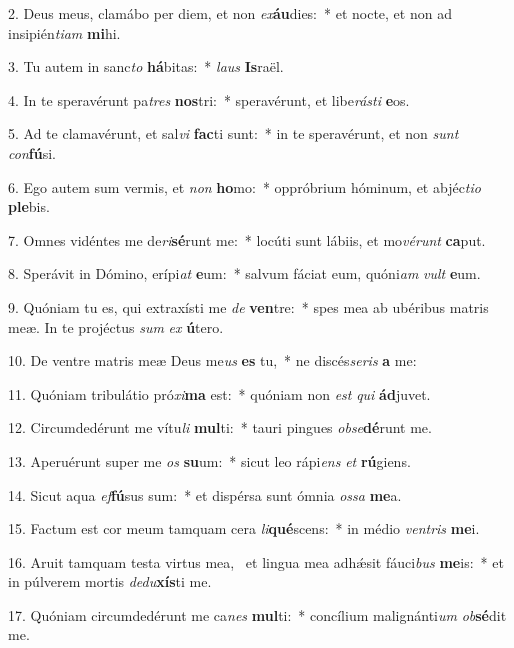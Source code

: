 2. Deus meus, clamábo per diem, et non \textit{ex}\textbf{áu}dies:~*  et nocte, et non ad insipién\textit{ti}\textit{am} \textbf{mi}hi.\

3. Tu autem in sanc\textit{to} \textbf{há}bitas:~*  \textit{laus} \textbf{Is}raël.\

4. In te speravérunt pa\textit{tres} \textbf{nos}tri:~*  speravérunt, et libe\textit{rás}\textit{ti} \textbf{e}os.\

5. Ad te clamavérunt, et sal\textit{vi} \textbf{fac}ti sunt:~*  in te speravérunt, et non \textit{sunt} \textit{con}\textbf{fú}si.\

6. Ego autem sum vermis, et \textit{non} \textbf{ho}mo:~*  oppróbrium hóminum, et abjéc\textit{ti}\textit{o} \textbf{ple}bis.\

7. Omnes vidéntes me de\textit{ri}\textbf{sé}runt me:~*  locúti sunt lábiis, et mo\textit{vé}\textit{runt} \textbf{ca}put.\

8. Sperávit in Dómino, erípi\textit{at} \textbf{e}um:~*  salvum fáciat eum, quóni\textit{am} \textit{vult} \textbf{e}um.\

9. Quóniam tu es, qui extraxísti me \textit{de} \textbf{ven}tre:~*  spes mea ab ubéribus matris meæ. In te projéctus \textit{sum} \textit{ex} \textbf{ú}tero.\

10. De ventre matris meæ Deus me\textit{us} \textbf{es} tu,~*  ne discés\textit{se}\textit{ris} \textbf{a} me:\

11. Quóniam tribulátio pró\textit{xi}\textbf{ma} est:~*  quóniam non \textit{est} \textit{qui} \textbf{ád}juvet.\

12. Circumdedérunt me vítu\textit{li} \textbf{mul}ti:~*  tauri pingues \textit{ob}\textit{se}\textbf{dé}runt me.\

13. Aperuérunt super me \textit{os} \textbf{su}um:~*  sicut leo rápi\textit{ens} \textit{et} \textbf{rú}giens.\

14. Sicut aqua \textit{ef}\textbf{fú}sus sum:~*  et dispérsa sunt ómnia \textit{os}\textit{sa} \textbf{me}a.\

15. Factum est cor meum tamquam cera \textit{li}\textbf{qué}scens:~*  in médio \textit{ven}\textit{tris} \textbf{me}i.\

16. Aruit tamquam testa virtus mea, \dag\  et lingua mea adhǽsit fáuci\textit{bus} \textbf{me}is:~*  et in púlverem mortis \textit{de}\textit{du}\textbf{xís}ti me.\

17. Quóniam circumdedérunt me ca\textit{nes} \textbf{mul}ti:~*  concílium malignánti\textit{um} \textit{ob}\textbf{sé}dit me.\

